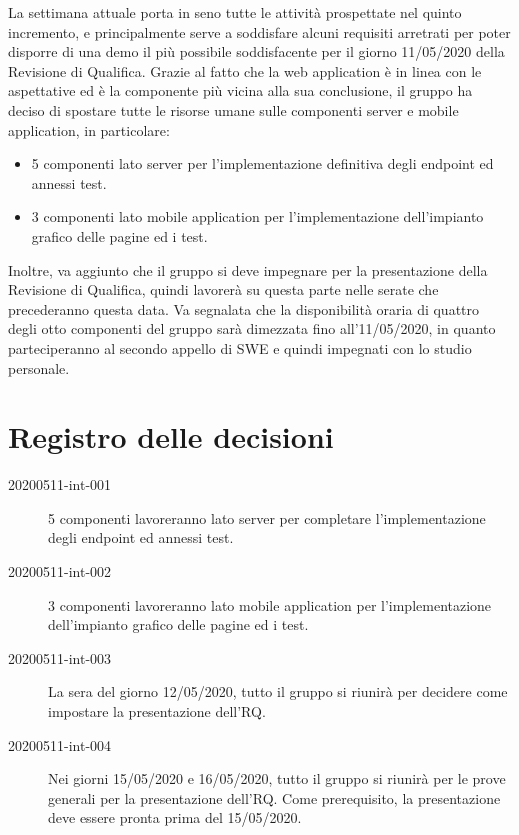 \documentclass{article}
\begin{document}
La settimana attuale porta in seno tutte le attività prospettate nel quinto incremento, e principalmente serve a soddisfare alcuni requisiti arretrati per poter disporre di una demo il più possibile soddisfacente per il giorno 11/05/2020 della Revisione di Qualifica.
Grazie al fatto che la web application è in linea con le aspettative ed è la componente più vicina alla sua conclusione, il gruppo ha deciso di spostare tutte le risorse umane sulle componenti server e mobile application, in particolare:
\begin{itemize}
  \item 5 componenti lato server per l'implementazione definitiva degli endpoint ed annessi test.
  \item 3 componenti lato mobile application per l'implementazione dell'impianto grafico delle pagine ed i test.
\end{itemize}
Inoltre, va aggiunto che il gruppo si deve impegnare per la presentazione della Revisione di Qualifica, quindi lavorerà su questa parte nelle serate che precederanno questa data.
Va segnalata che la disponibilità oraria di quattro degli otto componenti del gruppo sarà dimezzata fino all'11/05/2020, in quanto parteciperanno al secondo appello di SWE e quindi impegnati con lo studio personale.

\newpage
\section{Registro delle decisioni}%
\label{sec:registro_delle_decisioni}

\begin{description}
  \item[20200511-int-001] 5 componenti lavoreranno lato server per completare l'implementazione degli endpoint ed annessi test.
  \item[20200511-int-002] 3 componenti lavoreranno lato mobile application per l'implementazione dell'impianto grafico delle pagine ed i test.
  \item[20200511-int-003] La sera del giorno 12/05/2020, tutto il gruppo si riunirà per decidere come impostare la presentazione dell'RQ\@.
  \item[20200511-int-004] Nei giorni 15/05/2020 e 16/05/2020, tutto il gruppo si riunirà per le prove generali per la presentazione dell'RQ\@. Come prerequisito, la presentazione deve essere pronta prima del 15/05/2020.
\end{description}

\end{document}
